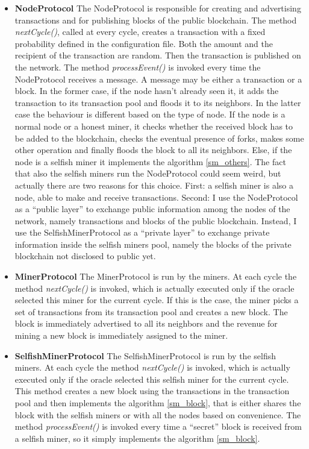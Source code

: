 \documentclass{article}
\begin{document}
\begin{itemize}
\item \textbf{NodeProtocol} The NodeProtocol is responsible for creating and advertising transactions and for publishing blocks of the public blockchain. The method \textit{nextCycle()}, called at every cycle, creates a transaction with a fixed probability defined in the configuration file. Both the amount and the recipient of the transaction are random. Then the transaction is published on the network. The method \textit{processEvent()} is invoked every time the NodeProtocol receives a message. A message may be either a transaction or a block. In the former case, if the node hasn't already seen it, it adds the transaction to its transaction pool and floods it to its neighbors. In the latter case the behaviour is different based on the type of node. If the node is a normal node or a honest miner, it checks whether the received block has to be added to the blockchain, checks the eventual presence of forks, makes some other operation and finally floods the block to all its neighbors. Else, if the node is a selfish miner it implements the algorithm \ref{sm_others}. The fact that also the selfish miners run the NodeProtocol could seem weird, but actually there are two reasons for this choice. First: a selfish miner is also a node, able to make and receive transactions. Second: I use the NodeProtocol as a ``public layer'' to exchange public information among the nodes of the network, namely transactions and blocks of the public blockchain. Instead, I use the SelfishMinerProtocol as a ``private layer'' to exchange private information inside the selfish miners pool, namely the blocks of the private blockchain not disclosed to public yet. 
\item \textbf{MinerProtocol} The MinerProtocol is run by the miners. At each cycle the method \textit{nextCycle()} is invoked, which is actually executed only if the oracle selected this miner for the current cycle. If this is the case, the miner picks a set of transactions from its transaction pool and creates a new block. The block is immediately advertised to all its neighbors and the revenue for mining a new block is immediately assigned to the miner.  
\item \textbf{SelfishMinerProtocol} The SelfishMinerProtocol is run by the selfish miners. At each cycle the method \textit{nextCycle()} is invoked, which is actually executed only if the oracle selected this selfish miner for the current cycle. This method creates a new block using the transactions in the transaction pool and then implements the algorithm \ref{sm_block}, that is either shares the block with the selfish miners or with all the nodes based on convenience. The method \textit{processEvent()} is invoked every time a ``secret'' block is received from a selfish miner, so it simply implements the algorithm \ref{sm_block}.
\end{itemize}
\end{document}
